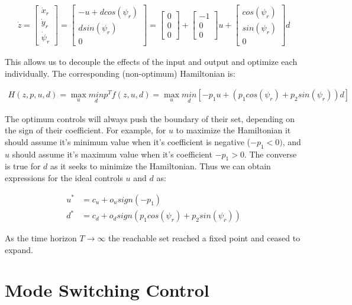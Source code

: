 \documentclass[a4paper]{article}
\begin{document}
\begin{align*}
  \dot{z}
  =
  \left[\begin{matrix} \dot{x}_r \\ \dot{y}_r \\ \dot{\psi}_r \end{matrix}\right]
  =
  \left[\begin{matrix} -u + d cos(\psi_r) \\ d sin(\psi_r) \\ 0 \end{matrix}\right]
  =
  \left[ \begin{matrix} 0 \\ 0 \\ 0 \end{matrix}\right] + \left[ \begin{matrix}-1 \\ 0 \\ 0\end{matrix}\right] u +\left[\begin{matrix} cos(\psi_r) \\ sin(\psi_r) \\ 0 \end{matrix}\right] d
\end{align*}

This allows us to decouple the effects of the input and output and optimize each individually.
   The corresponding (non-optimum) Hamiltonian is:

\begin{align*}
  H(z,p,u,d) = \underset{u}{\max} \underset{d}{min} p^T f(z,u,d) = \underset{u}{\max} \underset{d}{min} [ -p_1 u + (p_1 cos(\psi_r) + p_2 sin(\psi_r)) d ]
\end{align*}

The optimum controls will always push the boundary of their set, depending on the sign of their coefficient.
For example, for $u$ to maximize the Hamiltonian it should assume it's minimum value when it's coefficient is negative ($-p_1 < 0)$, and $u$ should assume it's maximum value when it's coefficient $-p_1 > 0$.
The converse is true for $d$ as it seeks to minimize the Hamiltonian.
Thus we can obtain expressions for the ideal controls $u$ and $d$ as:

\begin{align*}
  u^* &= c_u + o_u sign(-p_1) \\
  d^* &= c_d + o_d sign(p_1 cos(\psi_r) + p_2 sin(\psi_r))
\end{align*}

As the time horizon $T \rightarrow \infty$ the reachable set reached a fixed point and ceased to expand.

\section{Mode Switching Control}
\end{document}
